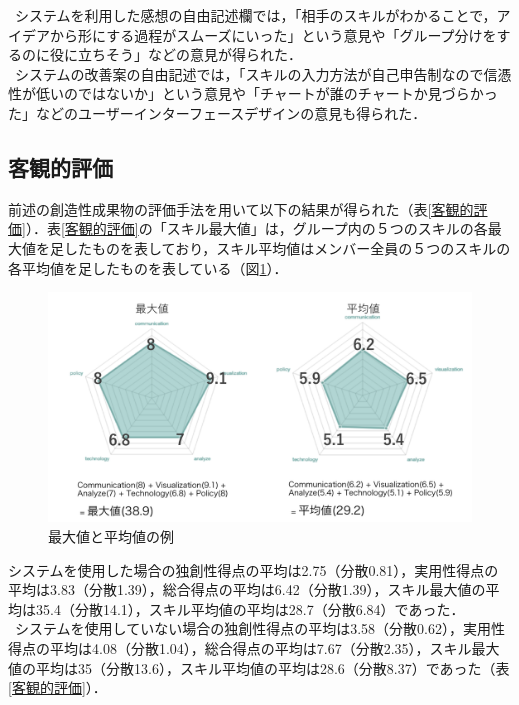 \documentclass{funthesis}
\begin{document}
\ システムを利用した感想の自由記述欄では，「相手のスキルがわかることで，アイデアから形にする過程がスムーズにいった」という意見や「グループ分けをするのに役に立ちそう」などの意見が得られた．\\
\ システムの改善案の自由記述では，「スキルの入力方法が自己申告制なので信憑性が低いのではないか」という意見や「チャートが誰のチャートか見づらかった」などのユーザーインターフェースデザインの意見も得られた．

\subsection{客観的評価}
前述の創造性成果物の評価手法を用いて以下の結果が得られた（表\ref{客観的評価}）．表\ref{客観的評価}の「スキル最大値」は，グループ内の５つのスキルの各最大値を足したものを表しており，スキル平均値はメンバー全員の５つのスキルの各平均値を足したものを表している（図\ref{ex}）．\\
\begin{figure}[H]
 \centering
   \includegraphics[width=120mm]{figures/extest.png}
 \caption{最大値と平均値の例}
 \label{ex}
\end{figure}

システムを使用した場合の独創性得点の平均は2.75（分散0.81），実用性得点の平均は3.83（分散1.39），総合得点の平均は6.42（分散1.39），スキル最大値の平均は35.4（分散14.1），スキル平均値の平均は28.7（分散6.84）であった．\\
\ システムを使用していない場合の独創性得点の平均は3.58（分散0.62），実用性得点の平均は4.08（分散1.04），総合得点の平均は7.67（分散2.35），スキル最大値の平均は35（分散13.6），スキル平均値の平均は28.6（分散8.37）であった（表\ref{客観的評価}）．
\end{document}
